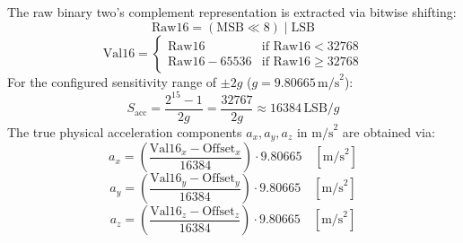 \documentclass[11pt, a4paper]{article}
\begin{document}
The raw binary two's complement representation is extracted via bitwise shifting:
\begin{equation}
    \text{Raw16} = (\text{MSB} \ll 8) \mid \text{LSB}
\end{equation}
\begin{equation}
    \text{Val16} = \begin{cases} \text{Raw16} & \text{if } \text{Raw16} < 32768 \\ \text{Raw16} - 65536 & \text{if } \text{Raw16} \ge 32768 \end{cases}
\end{equation}
For the configured sensitivity range of $\pm 2g$ ($g = 9.80665\,\text{m/s}^2$):
\begin{equation}
    S_{\text{acc}} = \frac{2^{15}-1}{2g} = \frac{32767}{2g} \approx 16384\,\text{LSB}/g
\end{equation}
The true physical acceleration components $a_x, a_y, a_z$ in $\text{m/s}^2$ are obtained via:
\begin{equation}
    a_x = \left(\frac{\text{Val16}_x - \text{Offset}_x}{16384}\right) \cdot 9.80665 \quad [\text{m/s}^2]
\end{equation}
\begin{equation}
    a_y = \left(\frac{\text{Val16}_y - \text{Offset}_y}{16384}\right) \cdot 9.80665 \quad [\text{m/s}^2]
\end{equation}
\begin{equation}
    a_z = \left(\frac{\text{Val16}_z - \text{Offset}_z}{16384}\right) \cdot 9.80665 \quad [\text{m/s}^2]
\end{equation}
\end{document}
